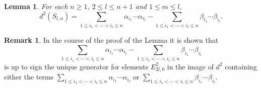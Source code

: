 \documentclass{article}
\theoremstyle{plain}
\newtheorem{lem}[thm]{Lemma}
\theoremstyle{definition}
\newtheorem{rmk}[thm]{Remark}
\numberwithin{thm}{section}
\begin{document}
				\begin{lem}\label{lem:term1}
				For each $n \geq 1$, $2 \leq l \leq n+1$ and $1\leq m\leq l$,
				\begin{equation*}
					d^{2}(S_{l,n})
					=\sum_{1\leq i_1<\cdots<i_l\leq n}{\alpha_{i_1}\cdots\alpha_{i_l}}-\sum_{1\leq i_1<\cdots<i_l\leq n}{\beta_{i_1}\cdots\beta_{i_l}}.
				\end{equation*}
				\end{lem}
				\begin{rmk}\label{rmk:unique1}
				In the course of the proof of the Lemma it is shown that
				\begin{equation*}
				\sum_{1\leq i_1<\cdots<i_l\leq n}{\alpha_{i_1}\cdots\alpha_{i_l}}-\sum_{1\leq i_1<\cdots<i_l\leq n}{\beta_{i_1}\cdots\beta_{i_l}}
				\end{equation*}
				is up to sign the unique generator for elements $E^2_{2l,0}$ in the image of $d^2$ containing either the terms
				$\sum_{1\leq i_1<\cdots<i_l\leq n}{\alpha_{i_1}\cdots\alpha_{i_l}}$ or $\sum_{1\leq i_1<\cdots<i_l\leq n}{\beta_{i_1}\cdots\beta_{i_l}}$.
				\end{rmk}
				
\end{document}
